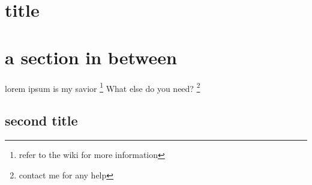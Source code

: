 \documentclass{article}
\begin{document}
    \section{title}
    \lipsum[1-2]
    
    \pagebreak
    \section{a section in between}
    \lipsum[1-2] 
    lorem ipsum is my savior
    \footnote{refer to the wiki for more information} 
    What else do you need?
    \footnote{contact me for any help}
    \begin{landscape}
    \section{second title}
    \lipsum[1-2]
    \end{landscape}
    
    \lipsum[1-10]
\end{document}
